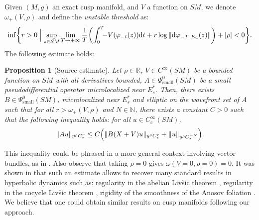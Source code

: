 \documentclass[JEP,XML,SOM,Unicode,NoFloatCountersInSection]{cedram}
\newcommand{\R}{\mathbb{R}}
\newcommand{\N}{\mathbb{N}}
\newcommand{\dd}{\mathrm{d}}
\theoremstyle{plain}
\newtheorem{proposition}{Proposition}[section]
\theoremstyle{definition}
\begin{document}
Given $(M,g)$ an exact cusp manifold, and $V$ a function on $SM$, we denote $\omega_+(V,\rho)$ and define the \emph{unstable threshold} as:
\begin{equation}
\label{equation:threshold}
\inf\biggl\{r > 0\Bigm| \sup_{z \in SM} \lim_{T \to +\infty} \frac{1}{T} \biggl(\int_0^T\hspace{-5pt} -V(\varphi_{-t}(z)) \dd t + r \log \|\dd \varphi_{-T}|_{E_u}(z)\|\biggr) + |\rho| < 0 \biggr\}.
\end{equation}
The following estimate holds:
\begin{proposition}[Source estimate]
\label{proposition:radiale}
Let $\rho \in \R$, $V \in C^\infty(SM)$ be a bounded function on $SM$ with all derivatives bounded, $A \in \Psi^0_{\mathrm{small}}(SM)$ be a small pseudodifferential operator microlocalized near $E_s^*$. Then, there exists $B \in \Psi^0_{\mathrm{small}}(SM)$, microlocalized near $E_s^*$ and elliptic on the wavefront set of $A$ such that for all $r > \omega_+(V,\rho)$ and $N \in \N$, there exists a constant $C > 0$ such that the following inequality holds: for all $u \in C^\infty_c(SM)$,
\begin{equation}
\label{equation:radiale}
\|Au \|_{y^\rho C^r_*} \leq C \Bigl(\|B(X+V)u\|_{y^\rho C^r_*} + \|u\|_{y^\rho C^{-N}_*} \Bigr).
\end{equation}
\end{proposition}

This inequality could be phrased in a more general context involving vector bundles, as in \cite{Bonthonneau-Lefeuvre-21}. Also observe that taking $\rho = 0$ gives $\omega(V=0,\rho=0) = 0$. It was shown in \cite{Bonthonneau-Lefeuvre-21} that such an estimate allows to recover many standard results in hyperbolic dynamics such as: regularity in the abelian Liv\v{s}ic theorem \cite{Livsic-72,DeLaLlave-Marco-Moryon-86}, regularity in the cocycle Liv\v{s}ic theorem \cite{Nitica-Torok-98}, rigidity of the smoothness of the Anosov foliation \cite{Hasselblatt-92}. We believe that one could obtain similar results on cusp manifolds following our approach.
\end{document}
